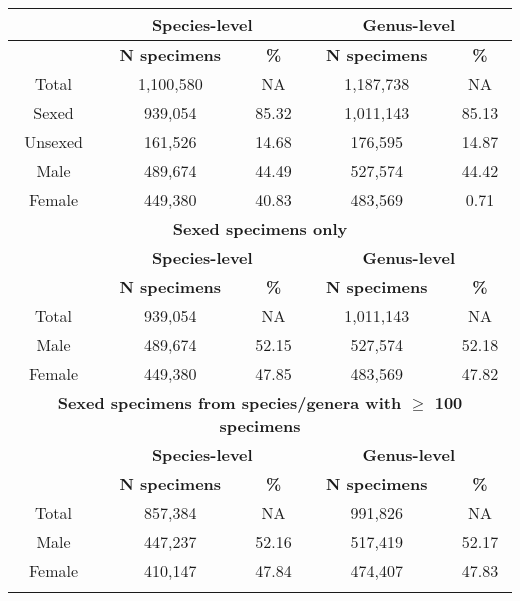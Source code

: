 \begin{longtable}{ccccc}
  \hline
  & \multicolumn{2}{c}{\textbf{Species-level}} & \multicolumn{2}{c}{\textbf{Genus-level}} \\
  \hline
  & \textbf{N specimens} & \textbf{\%} & \textbf{N specimens} & \textbf{\%}\\
\hline
Total & 1,100,580 & NA & 1,187,738 & NA\\
Sexed & 939,054 & 85.32 & 1,011,143 & 85.13\\
Unsexed & 161,526 & 14.68 & 176,595 & 14.87\\
Male & 489,674 & 44.49 & 527,574 & 44.42\\
Female & 449,380 & 40.83 & 483,569 & 0.71\\
\hline
\multicolumn{5}{c}{\textbf{Sexed specimens only}}\\
  \hline
  & \multicolumn{2}{c}{\textbf{Species-level}} & \multicolumn{2}{c}{\textbf{Genus-level}} \\
  \hline
  & \textbf{N specimens} & \textbf{\%} & \textbf{N specimens} & \textbf{\%}\\
\hline
Total & 939,054 & NA & 1,011,143 & NA\\
Male & 489,674 & 52.15 & 527,574 & 52.18\\
Female & 449,380 & 47.85 & 483,569 & 47.82\\
\hline
\multicolumn{5}{c}{\textbf{Sexed specimens from species/genera with $\geq$ 100 specimens}}\\
  \hline
  & \multicolumn{2}{c}{\textbf{Species-level}} & \multicolumn{2}{c}{\textbf{Genus-level}} \\
  \hline
  & \textbf{N specimens} & \textbf{\%} & \textbf{N specimens} & \textbf{\%}\\
\hline
Total & 857,384 & NA & 991,826 & NA\\
Male & 447,237 & 52.16 & 517,419 & 52.17\\
Female & 410,147 & 47.84 & 474,407 & 47.83\\
\hline

\label{table_genus}
\end{longtable}





